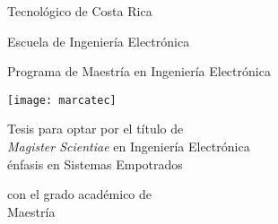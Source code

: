 
\thispagestyle{empty} 

\begin{center}

Tecnológico de Costa Rica

\par\vspace{1ex}

Escuela de Ingeniería Electrónica

\vspace{10pt}

Programa de Maestría en Ingeniería Electrónica

\par\vspace{20mm}

\texttt{[image: marcatec]}

\par\vspace*{\fill}

{\large\bf{\scriptTitle}}

\par\vspace*{\fill}

Tesis para optar por el título de \\
{\sf \emph{Magister Scientiae} en Ingeniería Electrónica \\
énfasis en Sistemas Empotrados}

\vspace{8pt}

con el grado académico de \\
{\sf Maestría} \\

%
%

\par\vspace{20mm}

\scriptAuthor

\vspace*{\fill}

\end{center}
\newpage 
\cleardoublepage 


